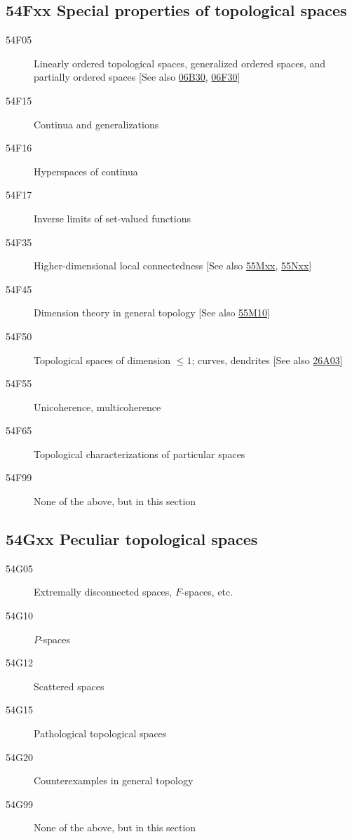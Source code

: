 \subsection*{54Fxx  Special properties of topological spaces}\label{54Fxx}
\begin{description}  
\item [54F05]\label{54F05} Linearly ordered topological spaces, generalized ordered spaces, and partially ordered spaces [See also \hyperref[06B30]{06B30}, \hyperref[06F30]{06F30}]
\item [54F15]\label{54F15} Continua and generalizations
\item [54F16]\label{54F16} Hyperspaces of continua
\item [54F17]\label{54F17} Inverse limits of set-valued functions
\item [54F35]\label{54F35} Higher-dimensional local connectedness [See also \hyperref[55Mxx]{55Mxx}, \hyperref[55Nxx]{55Nxx}]
\item [54F45]\label{54F45} Dimension theory in general topology [See also \hyperref[55M10]{55M10}]
\item [54F50]\label{54F50} Topological spaces of dimension $\leq 1$; curves, dendrites [See also \hyperref[26A03]{26A03}]
\item [54F55]\label{54F55} Unicoherence, multicoherence
\item [54F65]\label{54F65} Topological characterizations of particular spaces
\item [54F99]\label{54F99} None of the above, but in this section
\end{description}
\subsection*{54Gxx  Peculiar topological spaces }\label{54Gxx}
\begin{description}  
\item [54G05]\label{54G05} Extremally disconnected spaces, $F$-spaces, etc.
\item [54G10]\label{54G10} $P$-spaces
\item [54G12]\label{54G12} Scattered spaces
\item [54G15]\label{54G15} Pathological topological spaces
\item [54G20]\label{54G20} Counterexamples in general topology
\item [54G99]\label{54G99} None of the above, but in this section
\end{description}
